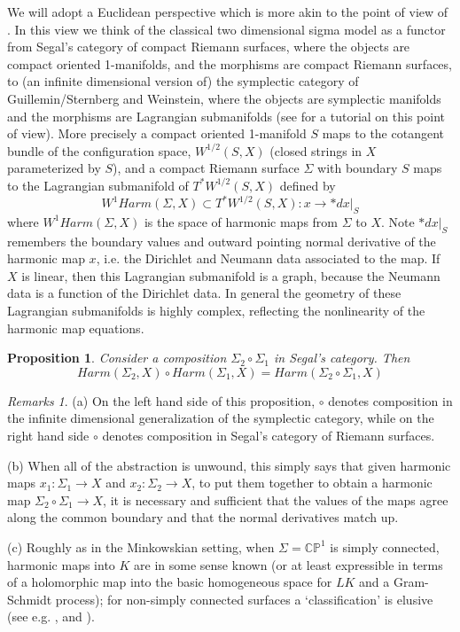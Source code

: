 \documentclass{amsart}
\newtheorem{proposition}{Proposition}
\theoremstyle{conjecture}
\theoremstyle{definition}
\theoremstyle{question}
\theoremstyle{questions}
\theoremstyle{remark}
\theoremstyle{remarks}
\newtheorem*{remarks}{Remarks}
\theoremstyle{example}
\numberwithin{equation}{section}
\begin{document}
We will adopt a Euclidean perspective which is more akin to the point of view of \cite{KS}. In this view we think of the classical two dimensional sigma model as a functor from
Segal's category of compact Riemann surfaces, where the objects are compact oriented 1-manifolds, and the morphisms are compact Riemann surfaces, to (an infinite dimensional version of) the symplectic category of Guillemin/Sternberg and Weinstein, where the objects are symplectic manifolds and the morphisms are Lagrangian submanifolds (see \cite{NP} for a tutorial on this point of view). More precisely a compact oriented 1-manifold $S$ maps to the cotangent bundle of the configuration space, $W^{1/2}(S,X)$ (closed strings in $X$ parameterized by $S$), and a compact Riemann surface $\Sigma$ with boundary $S$ maps to the Lagrangian submanifold of $T^*W^{1/2}(S,X)$ defined by
$$W^{1}Harm(\Sigma,X)\subset T^*W^{1/2}(S,X):x \to *dx|_S$$
where $W^1Harm(\Sigma,X)$ is the space of harmonic maps from $\Sigma$ to $X$. Note $*dx|_S$ remembers the boundary values and outward pointing normal derivative of the harmonic map $x$, i.e. the Dirichlet and Neumann data associated to the map. If $X$ is linear, then this Lagrangian submanifold is a graph, because the Neumann data is a function of the Dirichlet data. In general the geometry of these Lagrangian submanifolds is highly complex, reflecting the nonlinearity of the harmonic map equations.

\begin{proposition}\label{sewing}Consider a composition $\Sigma_2\circ \Sigma_1$ in Segal's category. Then
$$Harm(\Sigma_2,X) \circ Harm(\Sigma_1,X) = Harm(\Sigma_2\circ\Sigma_1,X)$$\end{proposition}

\begin{remarks} (a) On the left hand side of this proposition, $\circ$ denotes composition in the infinite dimensional generalization of the symplectic category, while on the right hand side $\circ$ denotes composition in Segal's category of Riemann surfaces.

(b) When all of the abstraction is unwound, this simply says that given harmonic maps $x_1:\Sigma_1\to X$ and $x_2:\Sigma_2\to X$, to put them together to obtain a harmonic map $\Sigma_2\circ \Sigma_1 \to X$, it is necessary and sufficient that the values of the maps agree along the common boundary and that the normal derivatives match up.

(c) Roughly as in the Minkowskian setting, when $\Sigma=\mathbb C\mathbb P^1$ is simply connected, harmonic maps into $K$ are in some sense known (or at least expressible in terms of a holomorphic map into the basic homogeneous space for $LK$ and a Gram-Schmidt process); for non-simply connected surfaces a `classification' is elusive (see e.g. \cite{Uhlenbeck1}, \cite{Guest} and \cite{Hitchin}).
\end{remarks}
\end{document}
